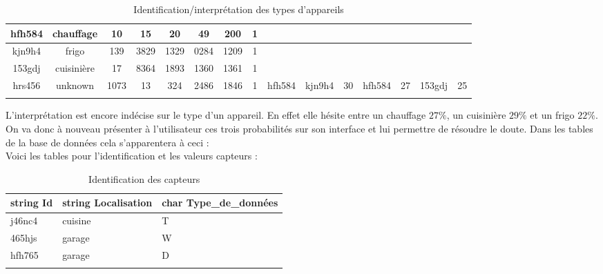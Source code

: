 \documentclass[10pt,a4paper]{article}
\begin{document}
\begin{table}[h]
{\begin{tabular}{|c|c|c|c|c|c|c|c|c|c|c|c|c|c|c|}
hfh584 & chauffage & 10 & 15 & 20 & 49 & 200 & 1 &  &  &  &  &  &  &  \\ \hline
kjn9h4 & frigo & 139 & 3829 & 1329 & 0284 & 1209 & 1 &  &  &  &  &  &  &  \\ \hline
153gdj & cuisinière & 17 & 8364 & 1893 & 1360 & 1361 & 1 &  &  &  &  &  &  &  \\ \hline
hrs456 & unknown & 1073 & 13 & 324 & 2486 & 1846 & 1 & hfh584 & kjn9h4 & 30 & hfh584 & 27 & 153gdj & 25 \\ \hline
 &  &  &  &  &  &  &  &  &  &  &  &  &  & 
\end{tabular}
}
\caption{Identification/interprétation des types d'appareils}
\end{table}

\newpage
L'interprétation est encore indécise sur le type d'un appareil. En effet elle hésite entre un chauffage $27\%$, un cuisinière $29\%$ et un frigo $22\%$. On va donc à nouveau présenter à l'utilisateur ces trois probabilités sur son interface et lui permettre de résoudre le doute. Dans les tables de la base de données cela s'apparentera à ceci :\\

Voici les tables pour l'identification et les valeurs capteurs :
\begin{table}[h!]
    \centering
    \begin{tabular}{|l|l|l|}
    \hline
    \rowcolor[HTML]{EFEFEF} 
    string Id & string Localisation & char Type\_de\_données \\ \hline
    j46nc4    & cuisine             & T                      \\ \hline
    465hjs    & garage              & W                      \\ \hline
    hfh765    & garage              & D                      \\ \hline
              &                     &                       
    \end{tabular}
    \caption{Identification des capteurs}
\end{table}
\end{document}
